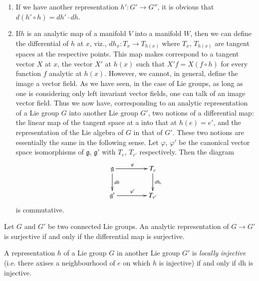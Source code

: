 \begin{remarks*}
\begin{enumerate}
\renewcommand{\labelenumi}{(\theenumi)}
\item If we have another representation $h' : G' \rightarrow G''$,
  it is obvious that $d(h' \circ  h)=dh'\cdot dh$. 

\item If\pageoriginale $h$ is an analytic map of a manifold $V$ into a
  manifold $W$, 
  then we can define the differential of $h$ at $x$, viz., $dh_x : T_x
  \rightarrow T_{h(x)}$ where $T_x$, $T_{h(x)}$ are tangent spaces
  at the respective points. This map makes correspond to a tangent
  vector $X$ at $x$, the vector $X'$ at $h(x)$ such that $X'f=X(f \circ
  h )$ for every function $f$ analytic at $h(x)$. However, we cannot,
  in general, define the image a vector field. As we have seen, in the
  case of Lie groups, as long as one is considering only left
  invariant vector fields, one can talk of an image vector field. Thus
  we now have, corresponding to an analytic representation of a Lie
  group $G$ into another Lie group $G'$, two notions of a differential
  map: the linear map of the tangent space at a into that at
  $h(e)=e'$, and the representation of the Lie algebra of $G$ in that
  of $G'$. These two notions are essentially the same in the following
  sense. Let $\varphi$, $\varphi'$  be the canonical vector space
  isomorphisms of $\mathfrak{g}$, $\mathfrak{g}'$ with $T_e$, $T_{e'}$
  respectively. Then the diagram 
\[
\xymatrix@C=1.5cm{
\mathfrak{g}\ar[d]^{dh}\ar[r]^{\varphi} & T_{e}\ar[d]^{dh_{e}}\\
\mathfrak{g}'\ar[r]^{\varphi'} & T_{e'}
}
\]
is commutative.
\end{enumerate}
\end{remarks*}

\begin{proposition}\label{chap3-prop2}%
 Let $G$ and $G'$ be two connected Lie groups. An analytic
 representation of $G \rightarrow G'$ is surjective if and only if
 the differential map is surjective. 
\end{proposition}

\begin{proposition}\label{chap3-prop3}%
A representation $h$ of a Lie group $G$ in another Lie group $G'$ is
{\em locally injective} (i.e. there axises a neighbourhood of $e$ on
which $h$ is injective) if and only if dh is injective. 
\end{proposition}

